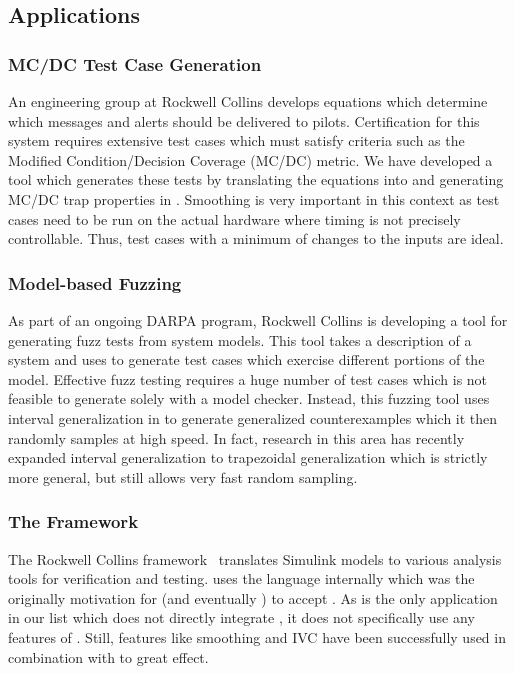 \subsection{Applications}

\subsubsection{MC/DC Test Case Generation}

An engineering group at Rockwell Collins develops equations
which determine which messages and alerts should be delivered to
pilots. Certification for this system requires extensive test cases
which must satisfy criteria such as the Modified Condition/Decision
Coverage (MC/DC) metric. We have developed a tool which generates
these tests by translating the equations into \lustre and generating
MC/DC trap properties in \jkind. Smoothing is very important in this
context as test cases need to be run on the actual hardware where
timing is not precisely controllable. Thus, test cases with a minimum
of changes to the inputs are ideal.

\subsubsection{Model-based Fuzzing}

As part of an ongoing DARPA program, Rockwell Collins is
developing a tool for generating fuzz tests from system models. This
tool takes a \lustre description of a system and uses \jkind to
generate test cases which exercise different portions of the model.
Effective fuzz testing requires a huge number of test cases which is
not feasible to generate solely with a model checker. Instead, this
fuzzing tool uses interval generalization in \jkind to generate
generalized counterexamples which it then randomly samples at high
speed. In fact, research in this area has recently expanded interval
generalization to trapezoidal generalization which is strictly more
general, but still allows very fast random sampling.


\subsubsection{The \gryphon Framework}

The Rockwell Collins \gryphon
 framework~\cite{miller2010cacm} translates Simulink models to various
 analysis tools for verification and testing. \gryphon uses the \lustre
 language internally which was the originally motivation for \kind
 (and eventually \jkind) to accept \lustre. As \gryphon is the only
 application in our list which does not directly integrate \jkind, it
 does not specifically use any features of \jkind. Still, features like
 smoothing and IVC have been successfully used in combination with
 \gryphon to great effect.










